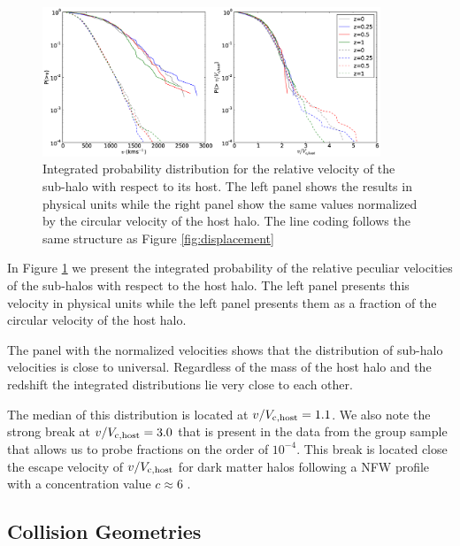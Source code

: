 \documentclass{emulateapj}
\begin{document}
\begin{figure}
\begin{center}
\includegraphics[width=0.9\textwidth]{figure_3.eps}
\end{center}
\caption{Integrated probability distribution for the relative velocity of the
sub-halo with respect to its host. The left panel shows the results
in physical units while the right panel show the same values
normalized by the circular velocity of the host halo. The line coding
follows the same structure as Figure \ref{fig:displacement}}
\label{fig:velocities}
\end{figure}

In Figure \ref{fig:velocities} we present the integrated probability
of the relative peculiar velocities of the sub-halos with respect to
the host halo. The left panel presents this velocity in physical units
while the left panel presents them as a fraction of the circular
velocity of the host halo.  


The panel with the normalized velocities shows that the distribution
of sub-halo velocities is close to universal. Regardless of the mass
of the host halo and the redshift the integrated distributions lie
very close to each other.  


The median of this distribution is located at $v/V_{\rm
  c,host}=1.1$. We also note the strong break at $v/V_{\rm
  c,host}=3.0$ that is present in the data from the group sample that
allows us to probe fractions on the order of $10^{-4}$.  This break is
located close the escape velocity of $v/V_{\rm c,host}$ for dark
matter halos following a NFW profile with a concentration value
$c\approx 6$ \citep{Hayashi2006}.  



\subsection{Collision Geometries}
\label{fig:geometry}
\end{document}
